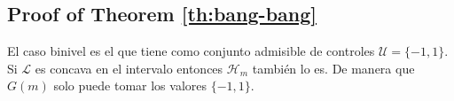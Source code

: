 
\subsection{Proof of Theorem \ref{th:bang-bang}}\label{proof:bang-bang}

El caso binivel es el que tiene como conjunto admisible de controles $\mathcal{U}= \{-1,1\}$.
\vspace{1em}
Si $\mathcal{L}$ es concava en el intervalo entonces $\mathcal{H}_m$ también lo es. De manera que $G(m)$ solo puede tomar los valores $\{-1,1\}$.

